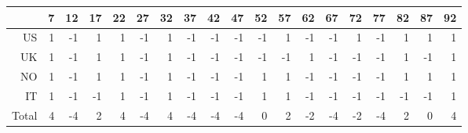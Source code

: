 \begin{tabular}{rrrrrrrrrrrrrrrrrrr}
  \hline
 & 7 & 12 & 17 & 22 & 27 & 32 & 37 & 42 & 47 & 52 & 57 & 62 & 67 & 72 & 77 & 82 & 87 & 92 \\ 
  \hline
US & 1 & -1 & 1 & 1 & -1 & 1 & -1 & -1 & -1 & -1 & 1 & -1 & -1 & 1 & -1 & 1 & 1 & 1 \\ 
  UK & 1 & -1 & 1 & 1 & -1 & 1 & -1 & -1 & -1 & -1 & -1 & 1 & -1 & -1 & -1 & 1 & -1 & 1 \\ 
  NO & 1 & -1 & 1 & 1 & -1 & 1 & -1 & -1 & -1 & 1 & 1 & -1 & -1 & -1 & -1 & 1 & 1 & 1 \\ 
  IT & 1 & -1 & -1 & 1 & -1 & 1 & -1 & -1 & -1 & 1 & 1 & -1 & -1 & -1 & -1 & -1 & -1 & 1 \\ 
  \hline
  Total & 4 & -4 & 2 & 4 & -4 & 4 & -4 & -4 & -4 & 0 & 2 & -2 & -4 & -2 & -4 & 2 & 0 & 4 \\ 
   \hline
\end{tabular}
